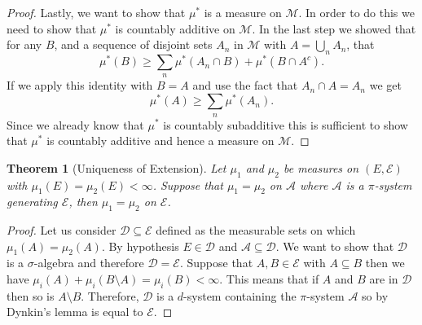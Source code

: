 \documentclass[11pt]{article}
\newtheorem{thm}{Theorem}[section]
\theoremstyle{definition}
\theoremstyle{remark}
\begin{document}
\begin{proof}
Lastly, we want to show that $\mu^*$ is a measure on $\mathscr{M}$. In order to do this we need to show that $\mu^*$ is countably additive on $\mathscr{M}$. In the last step we showed that for any $B$, and a sequence of disjoint sets $A_n$ in $\mathscr{M}$ with $A= \bigcup_n A_n$, that
\[ \mu^*(B) \geq \sum_n \mu^*(A_n \cap B) + \mu^*(B \cap A^c). \] If we apply this identity with $B=A$ and use the fact that $A_n \cap A = A_n$ we get
\[ \mu^*(A) \geq \sum_n \mu^*(A_n). \] Since we already know that $\mu^*$ is countably subadditive this is sufficient to show that $\mu^*$ is countably additive and hence a measure on $\mathscr{M}$.
\end{proof}

\begin{thm}[Uniqueness of Extension]
Let $\mu_1$ and $\mu_2$ be measures on $(E,\mathcal{E})$ with $\mu_1(E) = \mu_2(E) < \infty$. Suppose that $\mu_1 = \mu_2$ on $\mathcal{A}$ where $\mathcal{A}$ is a $\pi$-system generating $\mathcal{E}$, then $\mu_1 = \mu_2$ on $\mathcal{E}$.
\end{thm}
\begin{proof}
Let us consider $\mathcal{D} \subseteq \mathcal{E}$ defined as the measurable sets on which $\mu_1(A) = \mu_2(A)$. By hypothesis $E \in \mathcal{D}$ and $\mathcal{A} \subseteq \mathcal{D}$. We want to show that $\mathcal{D}$ is a $\sigma$-algebra and therefore $\mathcal{D} = \mathcal{E}$. Suppose that $A, B \in \mathcal{E}$ with $A \subseteq B$ then we have $\mu_i(A) + \mu_i (B \setminus A) = \mu_i(B) < \infty.$ This means that if $A$ and $B$ are in $\mathcal{D}$ then so is $A \setminus B$. Therefore, $\mathcal{D}$ is a $d$-system containing the $\pi$-system $\mathcal{A}$ so by Dynkin's lemma is equal to $\mathcal{E}$.
\end{proof}
\end{document}
